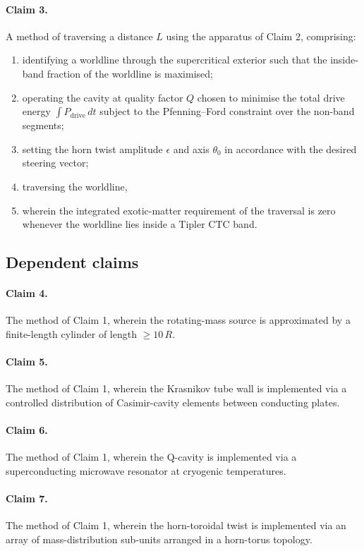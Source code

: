 \documentclass[11pt,a4paper]{article}
\begin{document}
\paragraph{Claim 3.} A method of traversing a distance $L$ using the apparatus of Claim 2, comprising:
\begin{enumerate}[label=(\alph*),leftmargin=2em]
\item identifying a worldline through the supercritical exterior such that the inside-band fraction of the worldline is maximised;
\item operating the cavity at quality factor $Q$ chosen to minimise the total drive energy $\int P_{\mathrm{drive}}\,d t$ subject to the Pfenning--Ford constraint over the non-band segments;
\item setting the horn twist amplitude $\epsilon$ and axis $\theta_0$ in accordance with the desired steering vector;
\item traversing the worldline,
\item wherein the integrated exotic-matter requirement of the traversal is zero whenever the worldline lies inside a Tipler CTC band.
\end{enumerate}

\subsection{Dependent claims}

\paragraph{Claim 4.} The method of Claim 1, wherein the rotating-mass source is approximated by a finite-length cylinder of length $\ge 10\,R$.

\paragraph{Claim 5.} The method of Claim 1, wherein the Krasnikov tube wall is implemented via a controlled distribution of Casimir-cavity elements between conducting plates.

\paragraph{Claim 6.} The method of Claim 1, wherein the Q-cavity is implemented via a superconducting microwave resonator at cryogenic temperatures.

\paragraph{Claim 7.} The method of Claim 1, wherein the horn-toroidal twist is implemented via an array of mass-distribution sub-units arranged in a horn-torus topology.
\end{document}
